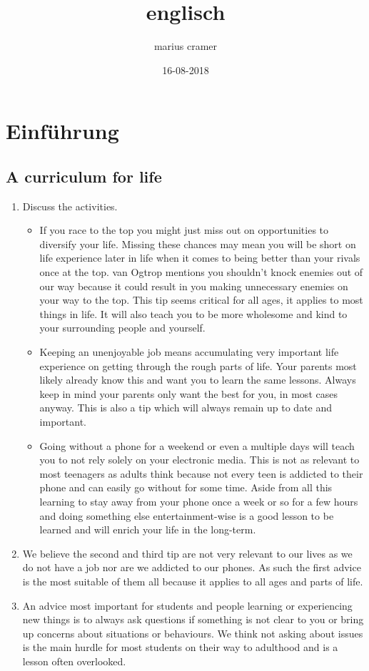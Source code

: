 \documentclass{article}
\title{englisch}
\author{marius cramer}
\date{16-08-2018}
\begin{document}
\maketitle

\tableofcontents

\newpage

\section{\textbf{Einführung}}
\subsection{A curriculum for life}
\begin{enumerate}
  \item Discuss the activities.
  \begin{itemize}
    \item If you race to the top you might just miss out on opportunities to diversify your life. Missing these chances may mean you will be short on life experience later in life when it comes to being better than your rivals once at the top. van Ogtrop mentions you shouldn't knock enemies out of our way because it could result in you making unnecessary enemies on your way to the top. This tip seems critical for all ages, it applies to most things in life. It will also teach you to be more wholesome and kind to your surrounding people and yourself.
    \item Keeping an unenjoyable job means accumulating very important life experience on getting through the rough parts of life. Your parents most likely already know this and want you to learn the same lessons. Always keep in mind your parents only want the best for you, in most cases anyway. This is also a tip which will always remain up to date and important.
    \item Going without a phone for a weekend or even a multiple days will teach you to not rely solely on your electronic media. This is not as relevant to most teenagers as adults think because not every teen is addicted to their phone and can easily go without for some time. Aside from all this learning to stay away from your phone once a week or so for a few hours and doing something else entertainment-wise is a good lesson to be learned and will enrich your life in the long-term.
  \end{itemize}
  \item We believe the second and third tip are not very relevant to our lives as we do not have a job nor are we addicted to our phones. As such the first advice is the most suitable of them all because it applies to all ages and parts of life.
  \item An advice most important for students and people learning or experiencing new things is to always ask questions if something is not clear to you or bring up concerns about situations or behaviours. We think not asking about issues is the main hurdle for most students on their way to adulthood and is a lesson often overlooked.
\end{enumerate}
\end{document}
